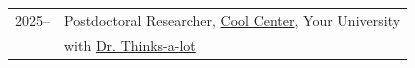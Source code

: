
\begin{longtable}[l]{@{}p{} p{}@{}}

    2025-- & Postdoctoral Researcher, \href{https://example.com/}{Cool Center}, Your University \\
     & \footnotesize with \href{https://example.com/}{Dr. Thinks-a-lot} \\

\end{longtable}
